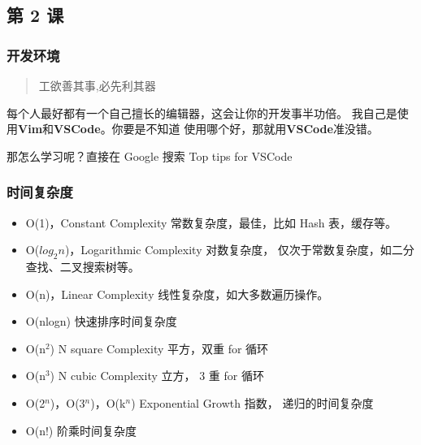 \subsection{第 2 课}

\subsubsection{开发环境}

\begin{quote}
工欲善其事,必先利其器
\end{quote}

每个人最好都有一个自己擅长的编辑器，这会让你的开发事半功倍。
我自己是使用\textbf{Vim}和\textbf{VSCode}。你要是不知道
使用哪个好，那就用\textbf{VSCode}准没错。

那怎么学习呢？直接在 Google 搜索 Top tips for VSCode

\subsubsection{时间复杂度}

\begin{itemize}
  \item O(1)，Constant Complexity 常数复杂度，最佳，比如 Hash 表，缓存等。
  \item O($log_2 n$)，Logarithmic Complexity 对数复杂度，
    仅次于常数复杂度，如二分查找、二叉搜索树等。
  \item O(n)，Linear Complexity 线性复杂度，如大多数遍历操作。
  \item O(nlogn) 快速排序时间复杂度
  \item O(n$^{2}$) N square Complexity 平方，双重 for 循环
  \item O(n$^{3}$) N cubic Complexity 立方， 3 重 for 循环
  \item O(2$^{n}$)，O(3$^{n}$)，O(k$^{n}$) Exponential Growth 指数，
    递归的时间复杂度
  \item O(n!) 阶乘时间复杂度
\end{itemize}
